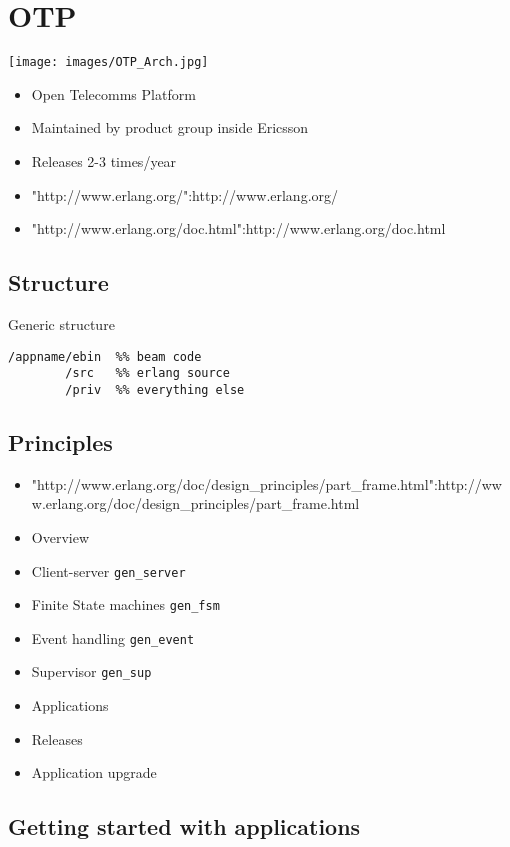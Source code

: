 \documentclass[12pt]{article}
\begin{document}
\section{OTP}

\texttt{[image: images/OTP\_Arch.jpg]}

\begin{itemize}
\item Open Telecomms Platform
\item Maintained by product group inside Ericsson
\item Releases 2-3 times/year
\item "http://www.erlang.org/":http://www.erlang.org/ 
\item "http://www.erlang.org/doc.html":http://www.erlang.org/doc.html
\end{itemize}

\subsection{Structure}

Generic structure

\begin{verbatim}
/appname/ebin  %% beam code
        /src   %% erlang source
        /priv  %% everything else
\end{verbatim}

\subsection{Principles}

\begin{itemize}
\item "http://www.erlang.org/doc/design\_principles/part\_frame.html":http://www.erlang.org/doc/design\_principles/part\_frame.html
\item Overview
\item Client-server \verb+gen_server+
\item Finite State machines \verb+gen_fsm+
\item Event handling \verb+gen_event+
\item Supervisor \verb+gen_sup+
\item Applications 
\item Releases
\item Application upgrade
\end{itemize}

\subsection{Getting started with applications}
\end{document}
